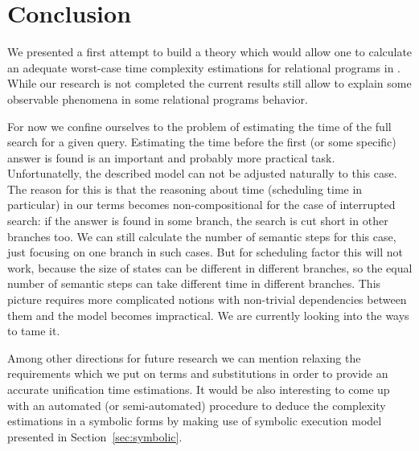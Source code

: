 \section{Conclusion}

We presented a first attempt to build a theory which would allow one to calculate an adequate worst-case time
complexity estimations for relational programs in \mK. While our research is not completed the current results still
allow to explain some observable phenomena in some relational programs behavior.

For now we confine ourselves to the problem of estimating the time of the full search for a given query. Estimating the time before the first (or some specific) answer is found is an important and probably more practical task. Unfortunatelly, the described model can not be adjusted naturally to this case. The reason for this is that the reasoning about time (scheduling time in particular) in our terms becomes non-compositional for the case of interrupted search: if the answer is found in some branch, the search is cut short in other branches too. We can still calculate the number of semantic steps for this case, just focusing on one branch in such cases. But for scheduling factor this will not work, because the size of states can be different in different branches, so the equal number of semantic steps can take different time in different branches. This picture requires more complicated notions with non-trivial dependencies between them and the model becomes impractical. We are currently looking into the ways to tame it.

Among other directions for future research we can mention relaxing the requirements which we put on
terms and substitutions in order to provide an accurate unification time estimations. It would be also
interesting to come up with an automated (or semi-automated) procedure to deduce the complexity
estimations in a symbolic forms by making use of symbolic execution model presented in Section~\ref{sec:symbolic}.
